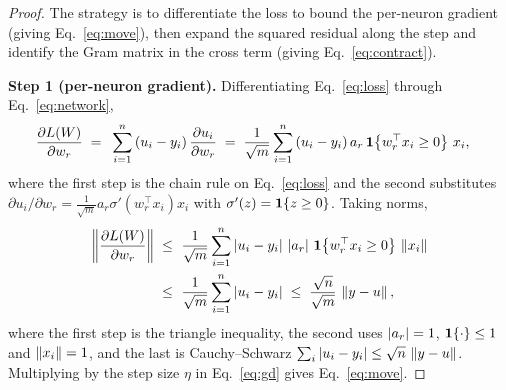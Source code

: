 \begin{proof}
The strategy is to differentiate the loss to bound the per-neuron gradient (giving
Eq.~\eqref{eq:move}), then expand the squared residual along the step and identify the Gram
matrix in the cross term (giving Eq.~\eqref{eq:contract}).

\smallskip\noindent\textbf{Step 1 (per-neuron gradient).}
Differentiating Eq.~\eqref{eq:loss} through Eq.~\eqref{eq:network},
\begin{align}\label{eq:grad-r}
\frac{\partial L(W)}{\partial w_r}
\;=\; & ~ \sum_{i=1}^{n} \left( u_i - y_i \right) \frac{\partial u_i}{\partial w_r}
\;=\; \frac{1}{\sqrt{m}} \sum_{i=1}^{n} \left( u_i - y_i \right) a_r\, \mathbf{1}\!\left\{w_r^{\top} x_i \ge 0\right\}\, x_i,
\end{align}
where the first step is the chain rule on Eq.~\eqref{eq:loss} and the second substitutes
$\partial u_i / \partial w_r = \tfrac{1}{\sqrt m} a_r \sigma'(w_r^{\top} x_i) x_i$ with
$\sigma'(z) = \mathbf{1}\!\left\{z \ge 0\right\}$. Taking norms,
\begin{align}\label{eq:grad-norm}
\left\|  \frac{\partial L(W)}{\partial w_r}  \right\|
\;\le\; & ~ \frac{1}{\sqrt{m}} \sum_{i=1}^{n} \left| u_i - y_i \right|\,
\left| a_r \right|\, \mathbf{1}\!\left\{w_r^{\top} x_i \ge 0\right\}\, \left\| x_i \right\| \\
\;\le\; & ~ \frac{1}{\sqrt{m}} \sum_{i=1}^{n} \left| u_i - y_i \right|
\;\le\; \frac{\sqrt{n}}{\sqrt{m}}\, \left\| y - u \right\|,
\end{align}
where the first step is the triangle inequality, the second uses $\left| a_r \right|=1$,
$\mathbf{1}\!\left\{\cdot\right\}\le1$ and $\left\| x_i \right\|=1$, and the last is Cauchy--Schwarz
$\sum_i \left| u_i - y_i \right| \le \sqrt{n}\,\left\| y - u \right\|$. Multiplying by the step size $\eta$ in
Eq.~\eqref{eq:gd} gives Eq.~\eqref{eq:move}.


\end{proof}
